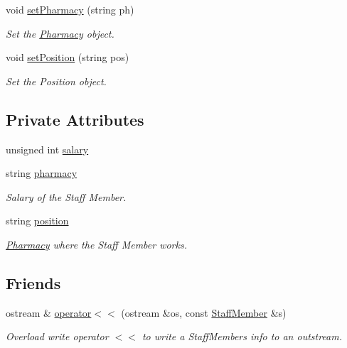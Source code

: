 \begin{DoxyCompactItemize}
void \hyperlink{classStaffMember_a628c894f76e94a3a9370e610ccdf78fe}{set\+Pharmacy} (string ph)
\begin{DoxyCompactList}\small\item\em Set the \hyperlink{classPharmacy}{Pharmacy} object. \end{DoxyCompactList}\item 
void \hyperlink{classStaffMember_afa7f9171f01d6d24ea25e0e458fca513}{set\+Position} (string pos)
\begin{DoxyCompactList}\small\item\em Set the Position object. \end{DoxyCompactList}\end{DoxyCompactItemize}
\subsection*{Private Attributes}
\begin{DoxyCompactItemize}
\item 
unsigned int \hyperlink{classStaffMember_ae64ceda8a343e92fe577ae6cad878e6c}{salary}
\item 
string \hyperlink{classStaffMember_a20cb40d4d2b8b26070b853fb4ab68ddf}{pharmacy}
\begin{DoxyCompactList}\small\item\em Salary of the Staff Member. \end{DoxyCompactList}\item 
string \hyperlink{classStaffMember_a170b93cb78c310afcb87b24c5164a9b7}{position}
\begin{DoxyCompactList}\small\item\em \hyperlink{classPharmacy}{Pharmacy} where the Staff Member works. \end{DoxyCompactList}\end{DoxyCompactItemize}
\subsection*{Friends}
\begin{DoxyCompactItemize}
\item 
ostream \& \hyperlink{classStaffMember_a439f44a9fdf5a48fddf42d0929184c9a}{operator$<$$<$} (ostream \&os, const \hyperlink{classStaffMember}{Staff\+Member} \&s)
\begin{DoxyCompactList}\small\item\em Overload write operator $<$$<$ to write a Staff\+Members info to an outstream. \end{DoxyCompactList}\end{DoxyCompactItemize}


